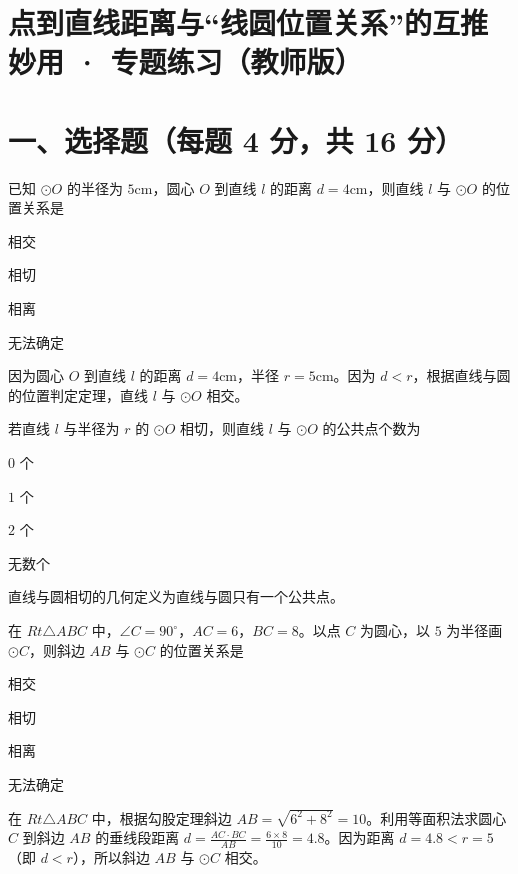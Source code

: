 \documentclass{exam-zh}
\begin{document}
\section*{点到直线距离与“线圆位置关系”的互推妙用 · 专题练习（教师版）}

\section*{一、选择题（每题 4 分，共 16 分）}


\begin{question}[points=4]
  已知 $\odot O$ 的半径为 $5\text{cm}$，圆心 $O$ 到直线 $l$ 的距离 $d = 4\text{cm}$，则直线 $l$ 与 $\odot O$ 的位置关系是
  \begin{choices}
    \item 相交
    \item 相切
    \item 相离
    \item 无法确定
  \end{choices}
  \paren[A]
  \begin{solutionblock}
    因为圆心 $O$ 到直线 $l$ 的距离 $d = 4\text{cm}$，半径 $r = 5\text{cm}$。因为 $d < r$，根据直线与圆的位置判定定理，直线 $l$ 与 $\odot O$ 相交。
  \end{solutionblock}
\end{question}



\begin{question}[points=4]
  若直线 $l$ 与半径为 $r$ 的 $\odot O$ 相切，则直线 $l$ 与 $\odot O$ 的公共点个数为
  \begin{choices}
    \item $0$ 个
    \item $1$ 个
    \item $2$ 个
    \item 无数个
  \end{choices}
  \paren[B]
  \begin{solutionblock}
    直线与圆相切的几何定义为直线与圆只有一个公共点。
  \end{solutionblock}
\end{question}



\begin{question}[points=4]
  在 $Rt\triangle ABC$ 中，$\angle C = 90^\circ$，$AC = 6$，$BC = 8$。以点 $C$ 为圆心，以 $5$ 为半径画 $\odot C$，则斜边 $AB$ 与 $\odot C$ 的位置关系是
  \begin{choices}
    \item 相交
    \item 相切
    \item 相离
    \item 无法确定
  \end{choices}
  \paren[A]
  \begin{solutionblock}
    在 $Rt\triangle ABC$ 中，根据勾股定理斜边 $AB = \sqrt{6^2 + 8^2} = 10$。利用等面积法求圆心 $C$ 到斜边 $AB$ 的垂线段距离 $d = \frac{AC \cdot BC}{AB} = \frac{6 \times 8}{10} = 4.8$。因为距离 $d = 4.8 < r = 5$（即 $d < r$），所以斜边 $AB$ 与 $\odot C$ 相交。
  \end{solutionblock}
\end{question}
\end{document}

